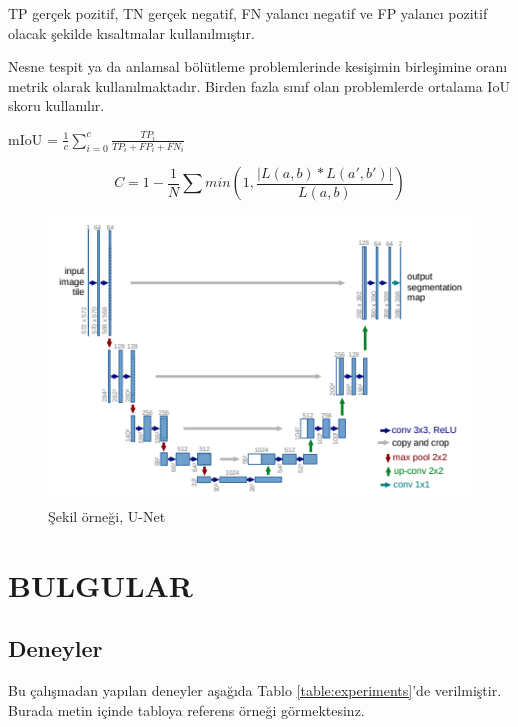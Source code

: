 \documentclass[a4paper, doc, natbib]{apa6}
\begin{document}
TP gerçek pozitif, TN gerçek negatif, FN yalancı negatif ve  FP yalancı pozitif olacak şekilde kısaltmalar kullanılmıştır. 

Nesne tespit ya da anlamsal bölütleme problemlerinde kesişimin birleşimine oranı metrik olarak kullanılmaktadır. Birden fazla sınıf olan problemlerde ortalama IoU skoru kullanılır. 
\begin{center}
    mIoU =  $\frac{1}{c} \sum_{i=0}^{c} \frac{ TP_i }{ TP_i + FP_i + FN_i }$ 
\end{center}

\begin{equation}
    C = 1 - \frac{1}{N} \sum min(1,\frac{ | L(a,b) * L(a',b') | } {L(a,b)} )
\end{equation}


\begin{figure}[ht!]
 \centering
 \includegraphics[width=0.9\linewidth]{ssunet.png}
 \caption{ Şekil örneği, U-Net }
 \label{figure:linknetmine}
\end{figure}

\clearpage
\newpage
\section{BULGULAR}
\subsection{Deneyler}
Bu çalışmadan yapılan deneyler aşağıda Tablo \ref{table:experiments}'de verilmiştir. Burada metin içinde tabloya referens örneği görmektesinz.
\end{document}
